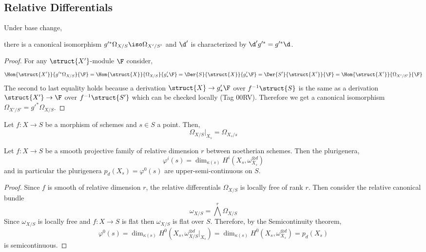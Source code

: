 \documentclass[12pt]{article}
\begin{document}
\subsection{Relative Differentials}

\begin{prop}
Under base change,
\begin{center}
\end{center}
there is a canonical isomorphism $g'^* \Omega_{X/S} \iso \Omega_{X'/S'}$ and $\d'$ is characterized by $\d' g'^* = g'^* \d$.
\end{prop}

\begin{proof}
For any $\struct{X'}$-module $\F$ consider,
\[ \Hom{\struct{X'}}{g'^* \Omega_{X/S}}{\F} = \Hom{\struct{X}}{\Omega_{X/S}}{g'_* \F} = \Der{S}{\struct{X}}{g'_* \F} =  \Der{S'}{\struct{X'}}{\F} = \Hom{\struct{X'}}{\Omega_{X'/S'}}{\F} \]
The second to last equality holds because a derivation $\struct{X} \to g'_* \F$ over $f^{-1} \struct{S}$ is the same as a derivation $\struct{X'} \to \F$ over $f^{-1} \struct{S'}$ which can be checked locally (Tag 00RV). Therefore we get a canonical isomorphism $\Omega_{X'/S'} = g'^* \Omega_{X/S}$.
\end{proof}

\begin{prop}
Let $f : X \to S$ be a morphism of schemes and $s \in S$ a point. Then,
\[ \Omega_{X/S} |_{X_s} = \Omega_{X_s / s} \]
\end{prop}

\begin{prop}
Let $f : X \to S$ be a smooth projective family of relative dimension $r$ between noetherian schemes. Then the plurigenera,
\[ \varphi^i(s) = \dim_{\kappa(s)} H^i(X_s, \omega_{X_s}^{\otimes d}) \]
and in particular the plurigenera $p_d(X_s) = \varphi^0(s)$
are upper-semi-continuous on $S$. 
\end{prop}

\begin{proof}
Since $f$ is smooth of relative dimension $r$, the relative differentials $\Omega_{X/S}$ is locally free of rank $r$. Then consider the relative canonical bundle \[ \omega_{X/S} = \bigwedge^{r} \Omega_{X/S} \]  Since $\omega_{X/S}$ is locally free and $f : X \to S$ is flat then $\omega_{X/S}$ is flat over $S$. Therefore, by the Semicontinuity theorem,
\[ \varphi^0(s) = \dim_{\kappa(s)} H^0(X_s, \omega_{X/S}^{\otimes d}|_{X_s}) = \dim_{\kappa(s)} H^0(X_s, \omega_{X_s}^{\otimes d}) = p_d(X_s) \]
is semicontinuous.
\end{proof}
\end{document}
